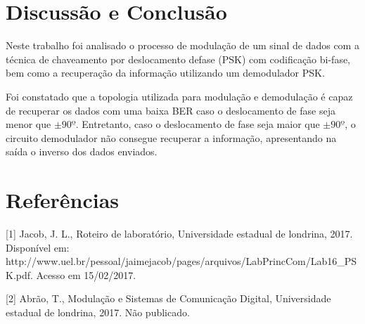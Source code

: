 \newpage
\section{Discussão e Conclusão}

	Neste trabalho foi analisado o processo de modulação de um sinal de dados com a técnica de chaveamento por deslocamento defase (PSK) com codificação bi-fase, bem como a recuperação da informação utilizando um demodulador PSK.
	
	Foi constatado que a topologia utilizada para modulação e demodulação é capaz de recuperar os dados com uma baixa BER caso o deslocamento de fase seja menor que $\pm 90º$. Entretanto, caso o deslocamento de fase seja maior que $\pm 90º$, o circuito demodulador não consegue recuperar a informação, apresentando na saída o inverso dos dados enviados.
	
\newpage
\section{Referências}
[1] Jacob, J. L., Roteiro de laboratório, Universidade estadual de londrina, 2017. Disponível em: http://www.uel.br/pessoal/jaimejacob/pages/arquivos/LabPrincCom/Lab16\_PSK.pdf. Acesso em 15/02/2017.

[2] Abrão, T., Modulação e Sistemas de Comunicação Digital, Universidade estadual de londrina, 2017. Não publicado.